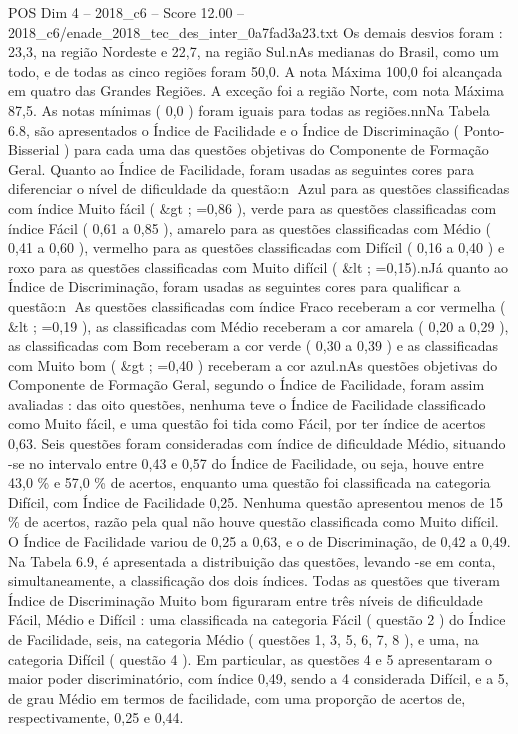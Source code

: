 \begin{textsample}{POS Dim 4 – 2018\_c6 – Score 12.00 – 2018\_c6/enade\_2018\_tec\_des\_inter\_0a7fad3a23.txt}
Os demais desvios foram : 23,3, na região Nordeste e 22,7, na região Sul.nAs medianas do Brasil, como um todo, e de todas as cinco regiões foram 50,0.
A nota Máxima 100,0 foi alcançada em quatro das Grandes Regiões.
A exceção foi a região Norte, com nota Máxima 87,5.
As notas mínimas ( 0,0 ) foram iguais para todas as regiões.nnNa Tabela 6.8, são apresentados o Índice de Facilidade e o Índice de Discriminação ( Ponto-Bisserial ) para cada uma das questões objetivas do Componente de Formação Geral.
Quanto ao Índice de Facilidade, foram usadas as seguintes cores para diferenciar o nível de dificuldade da questão:n Azul para as questões classificadas com índice Muito fácil ( \&gt ; =0,86 ), verde para as questões classificadas com índice Fácil ( 0,61 a 0,85 ), amarelo para as questões classificadas com Médio ( 0,41 a 0,60 ), vermelho para as questões classificadas com Difícil ( 0,16 a 0,40 ) e roxo para as questões classificadas com Muito difícil ( \&lt ; =0,15).nJá quanto ao Índice de Discriminação, foram usadas as seguintes cores para qualificar a questão:n As questões classificadas com índice Fraco receberam a cor vermelha ( \&lt ; =0,19 ), as classificadas com Médio receberam a cor amarela ( 0,20 a 0,29 ), as classificadas com Bom receberam a cor verde ( 0,30 a 0,39 ) e as classificadas com Muito bom ( \&gt ; =0,40 ) receberam a cor azul.nAs questões objetivas do Componente de Formação Geral, segundo o Índice de Facilidade, foram assim avaliadas : das oito questões, nenhuma teve o Índice de Facilidade classificado como Muito fácil, e uma questão foi tida como Fácil, por ter índice de acertos 0,63.
Seis questões foram consideradas com índice de dificuldade Médio, situando -se no intervalo entre 0,43 e 0,57 do Índice de Facilidade, ou seja, houve entre 43,0 \% e 57,0 \% de acertos, enquanto uma questão foi classificada na categoria Difícil, com Índice de Facilidade 0,25.
Nenhuma questão apresentou menos de 15 \% de acertos, razão pela qual não houve questão classificada como Muito difícil.
O Índice de Facilidade variou de 0,25 a 0,63, e o de Discriminação, de 0,42 a 0,49.
Na Tabela 6.9, é apresentada a distribuição das questões, levando -se em conta, simultaneamente, a classificação dos dois índices.
Todas as questões que tiveram Índice de Discriminação Muito bom figuraram entre três níveis de dificuldade Fácil, Médio e Difícil : uma classificada na categoria Fácil ( questão 2 ) do Índice de Facilidade, seis, na categoria Médio ( questões 1, 3, 5, 6, 7, 8 ), e uma, na categoria Difícil ( questão 4 ).
Em particular, as questões 4 e 5 apresentaram o maior poder discriminatório, com índice 0,49, sendo a 4 considerada Difícil, e a 5, de grau Médio em termos de facilidade, com uma proporção de acertos de, respectivamente, 0,25 e 0,44.

\end{textsample}
